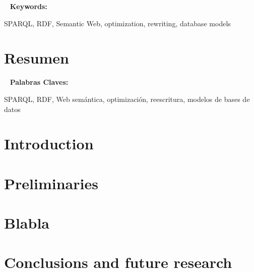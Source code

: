\documentclass[12pt,reqno,oneside]{pucthesis}
\begin{document}
~\vfill
{\bf Keywords:} \parbox[t]{.75\textwidth}{
  SPARQL, RDF, Semantic Web, optimization, rewriting, database models
}


\chapter*{Resumen}
\label{ch:resumen}
% 


~\vfill
{\bf Palabras Claves:} \parbox[t]{.75\textwidth}{
  SPARQL, RDF, Web sem\'antica, optimizaci\'on, reescritura, modelos de bases de datos
}


\cleardoublepage %




\chapter{Introduction}
\label{chapter:introduction}



\chapter{Preliminaries}
\label{chapter:preliminaries}



\chapter{Blabla}
\label{chapter:blabla}



\chapter{Conclusions and future research}
\label{chapter:conclusions}

\end{document}
